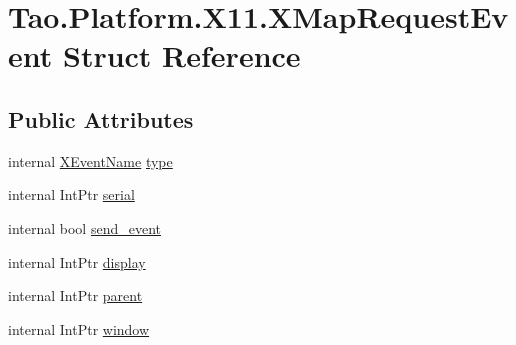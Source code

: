 \hypertarget{struct_tao_1_1_platform_1_1_x11_1_1_x_map_request_event}{
\section{Tao.Platform.X11.XMapRequestEvent Struct Reference}
\label{struct_tao_1_1_platform_1_1_x11_1_1_x_map_request_event}
}
\subsection*{Public Attributes}
\begin{DoxyCompactItemize}
\item 
internal \hyperlink{namespace_tao_1_1_platform_1_1_x11_aff81ed5b8778e1ea8e872861dff9f146}{XEventName} \hyperlink{struct_tao_1_1_platform_1_1_x11_1_1_x_map_request_event_ae783f1bba0ff97828d0e8a099975fb59}{type}
\item 
internal IntPtr \hyperlink{struct_tao_1_1_platform_1_1_x11_1_1_x_map_request_event_afc68c0f280edbd3f36b705b740fbc1af}{serial}
\item 
internal bool \hyperlink{struct_tao_1_1_platform_1_1_x11_1_1_x_map_request_event_a1c453d1fe2c78a2aca19a66d558dab8c}{send\_\-event}
\item 
internal IntPtr \hyperlink{struct_tao_1_1_platform_1_1_x11_1_1_x_map_request_event_a82baeee8cb3db5ce35d7b6f79d7c29f1}{display}
\item 
internal IntPtr \hyperlink{struct_tao_1_1_platform_1_1_x11_1_1_x_map_request_event_aaac9b9383ab31b2f1154b7cea5b012a0}{parent}
\item 
internal IntPtr \hyperlink{struct_tao_1_1_platform_1_1_x11_1_1_x_map_request_event_a5f44987927adc5b252795b18600363e3}{window}
\end{DoxyCompactItemize}


